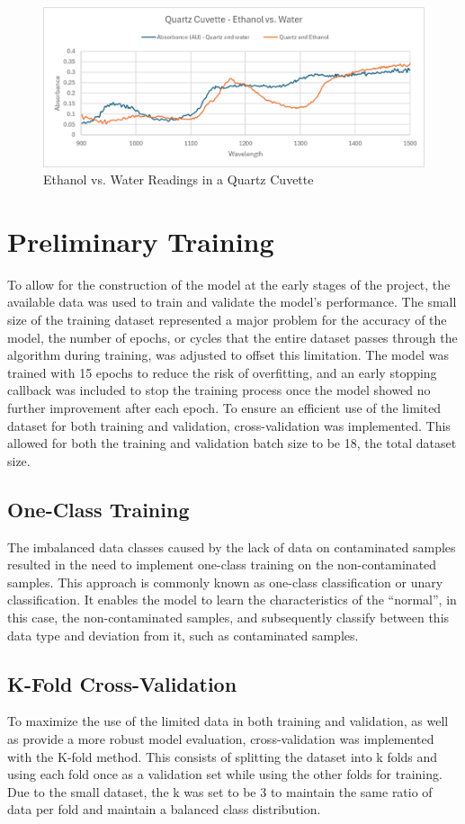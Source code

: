 \documentclass[12pt]{report}
\renewcommand{\cite}{\supercite}
\begin{document}
\begin{figure}[!h]
    \centering
    \includegraphics[width=0.75\linewidth]{Images/quartz_ew.png}
    \caption{Ethanol vs. Water Readings in a Quartz Cuvette}
    \label{fig:app_quartz}
\end{figure}

\section{Preliminary Training}
To allow for the construction of the model at the early stages of the project, the available data was used to train and validate the model’s performance. The small size of the training dataset represented a major problem for the accuracy of the model, the number of epochs, or cycles that the entire dataset passes through the algorithm during training, was adjusted to offset this limitation. The model was trained with 15 epochs to reduce the risk of overfitting, and an early stopping callback was included to stop the training process once the model showed no further improvement after each epoch. To ensure an efficient use of the limited dataset for both training and validation, cross-validation was implemented. This allowed for both the training and validation batch size to be 18, the total dataset size.

\subsection{One-Class Training}
The imbalanced data classes caused by the lack of data on contaminated samples resulted in the need to implement one-class training on the non-contaminated samples. This approach is commonly known as one-class classification or unary classification.\cite{brownlee_2020_oneclass} It enables the model to learn the characteristics of the “normal”, in this case, the non-contaminated samples, and subsequently classify between this data type and deviation from it, such as contaminated samples.

\subsection{K-Fold Cross-Validation}
To maximize the use of the limited data in both training and validation, as well as provide a more robust model evaluation, cross-validation was implemented with the K-fold method. This consists of splitting the dataset into k folds and using each fold once as a validation set while using the other folds for training. Due to the small dataset, the k was set to be 3 to maintain the same ratio of data per fold and maintain a balanced class distribution.
\end{document}
